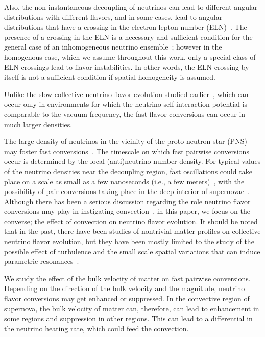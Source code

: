 \documentclass[aps, prd, 10pt, twocolumn, superscriptaddress, noshowpacs, preprintnumbers, longbibliography, groupedaddress, footinbib, bibnotes]{revtex4-1}
\begin{document}
Also, the non-instantaneous decoupling of neutrinos can lead to different angular distributions with different flavors, and in some cases, lead to angular distributions that have a crossing in the electron lepton number (ELN)~\cite{Shalgar:2019kzy}. The presence of a crossing in the ELN is a necessary and sufficient condition for the general case of an inhomogeneous neutrino ensemble~\cite{Morinaga:2021vmc}; however in the homogenous case, which we assume throughout this work, only a special class of ELN crossings lead to flavor instabilities. In other words, the ELN crossing by itself is not a sufficient condition if spatial  homogeneity is assumed.

Unlike the slow collective neutrino flavor evolution studied earlier~\cite{Duan:2006jv, Duan:2006an, Duan:2005cp, Duan:2010bg}, which can occur only in environments for which the neutrino self-interaction potential is comparable to the vacuum frequency, the fast flavor conversions can occur in much larger densities. 

The large density of neutrinos in the vicinity of the proto-neutron star (PNS) may foster fast conversions~\cite{Tamborra:2020cul}. 
The timescale on which fast pairwise conversions occur is determined by the local (anti)neutrino number density. For typical values of the neutrino densities near the decoupling region, fast oscillations could take place on a scale as small as a few nanoseconds (i.e., a few meters)~\cite{Capozzi:2019lso, Martin:2019gxb, Johns:2019izj, Johns:2020qsk, Dasgupta:2018ulw}, with the possibility of pair conversions taking place in the deep interior of supernovae~\cite{Glas:2019ijo}. Although there has been a serious discussion regarding the role neutrino flavor conversions may play in instigating convection~\cite{Pejcha:2011en, Suwa:2011ac, Pllumbi:2014saa}, in this paper, we focus on the converse; the effect of convection on neutrino flavor evolution. It should be noted that in the past, there have been studies of nontrivial matter profiles on collective neutrino flavor evolution, but they have been mostly limited to the study of the possible effect of turbulence and the small scale spatial variations that can induce parametric resonances~\cite{Friedland:2006ta, Kneller:2010sc, Choubey:2007ga, Akhmedov:1999ty, Kneller:2012id,Ma:2018key}.

We study the effect of the bulk velocity of matter on fast pairwise conversions. Depending on the direction of the bulk velocity and the magnitude, neutrino flavor conversions may get enhanced or suppressed. In the convective region of supernova, the bulk velocity of matter can, therefore, can lead to enhancement in some regions and suppression in other regions. This can lead to a differential in the neutrino heating rate, which could feed the convection. 
\end{document}
